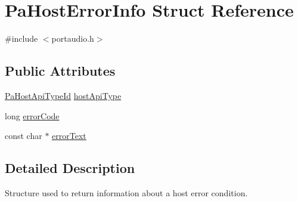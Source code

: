 \hypertarget{struct_pa_host_error_info}{\section{Pa\+Host\+Error\+Info Struct Reference}
\label{struct_pa_host_error_info}
}


{\ttfamily \#include $<$portaudio.\+h$>$}

\subsection*{Public Attributes}
\begin{DoxyCompactItemize}
\item 
\hyperlink{portaudio_8h_a8eaebe3d39c5ea45598da8f86dc2e5ae}{Pa\+Host\+Api\+Type\+Id} \hyperlink{struct_pa_host_error_info_aeadfc0e22fee75e94541876d6d7a91f7}{host\+Api\+Type}
\item 
long \hyperlink{struct_pa_host_error_info_a2ab15f358cd7f0a5e8f3d54e161a2fec}{error\+Code}
\item 
const char $\ast$ \hyperlink{struct_pa_host_error_info_aa40a7ed0c73b85b39563d80f7877876c}{error\+Text}
\end{DoxyCompactItemize}


\subsection{Detailed Description}
Structure used to return information about a host error condition. 

